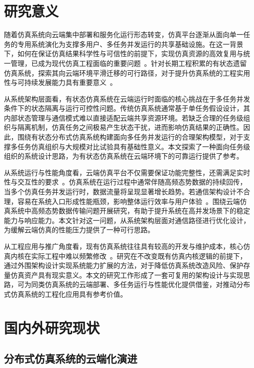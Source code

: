 \documentclass[lang=chs, degree=master, blindreview=true, winfonts=true, academic=false]{yanputhesis}
\begin{document}
\section{研究意义}

随着仿真系统向云端集中部署和服务化运行形态转变，仿真平台逐渐从面向单一任务的专用系统演化为支撑多用户、多任务并发运行的共享基础设施。在这一背景下，如何在保证仿真结果科学性与可信性的前提下，实现仿真资源的高效复用与统一管理，已成为现代仿真工程面临的重要问题~\cite{SHAHIN2020110752,ALZOUBI2013580}。针对长期工程积累的有状态遗留仿真系统，探索其向云端环境平滑迁移的可行路径，对于提升仿真系统的工程实用性与可持续发展能力具有重要意义~\cite{CHEN2018396}。

从系统架构层面看，有状态仿真系统在云端运行时面临的核心挑战在于多任务并发条件下的状态隔离与运行可控性问题。传统仿真系统通常基于单任务假设设计，其内部状态管理与通信模式难以直接适配云端共享资源环境。若缺乏合理的任务级组织与隔离机制，仿真任务之间极易产生状态干扰，进而影响仿真结果的正确性。因此，围绕有状态分布式仿真系统构建面向多任务并发运行的合理架构模型，对于支撑多任务仿真组织与大规模对比试验具有基础性意义。本文探索了一种面向任务级组织的系统设计思路，为有状态仿真系统在云端环境下的可靠运行提供了参考。

从系统运行与性能角度看，云端仿真平台不仅需要保证功能完整性，还需满足实时性与交互性的要求~\cite{LIU2012135,FORTMANNROE201428}。仿真系统在运行过程中通常伴随高频态势数据的持续回传，当多个仿真任务并发运行时，数据流量将呈现显著增长趋势。若通信架构设计不合理，容易在系统入口形成性能瓶颈，影响整体运行效率与用户体验~\cite{taibi2018architectural,ataei2023application,MEIJER2024112183}。围绕云端仿真系统中高频态势数据传输问题开展研究，有助于提升系统在高并发场景下的稳定能力与响应能力。本文针对这一问题，从系统架构层面对通信路径进行优化设计，为缓解云端仿真的性能压力提供了一种可行思路。

从工程应用与推广角度看，现有仿真系统往往具有较高的开发与维护成本，核心仿真内核在实际工程中难以频繁修改~\cite{CHEN2009981,SALMINEN2005103,DUBEY2009512}。研究在不改变既有仿真内核逻辑的前提下，通过外围架构设计实现系统能力扩展的方法，对于降低仿真系统改造风险、保护存量仿真资产具有现实意义。本文的研究工作形成了一套可复用的架构设计与实现思路，可为同类仿真系统的云端部署、多任务运行与性能优化提供借鉴，对推动分布式仿真系统的工程化应用具有参考价值。


\section{国内外研究现状}

\subsection{分布式仿真系统的云端化演进}
\end{document}
